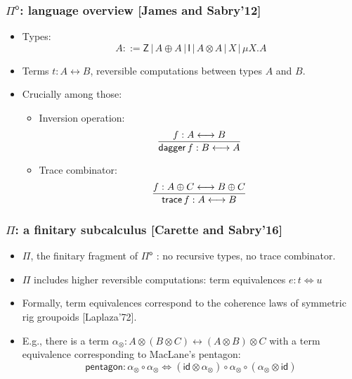 \documentclass[12pt,t]{beamer}
\newcommand{\Pio}{\ensuremath{\mathsf{\Pi}^{\mathsf{o}}}}
\newcommand{\id}{\mathsf{id}}
\newcommand{\lr}{\longleftrightarrow}
\newcommand{\trace}{\ensuremath{\mathsf{trace}}}
\newcommand{\Z}{\mathsf{Z}}
\newcommand{\I}{\mathsf{I}}
\newcommand{\LR}{\iff}
\renewcommand{\dagger}{\mathsf{dagger}}
\begin{document}
\begin{frame}

  \frametitle{\Pio: language overview [James and Sabry'12]}

  \begin{itemize}

  \item Types:
    \[
    A ::= \Z \, | \,A \oplus A \, | \,\I \,| \,A \otimes A \,| \,X \,|
    \,\mu X.A
    \]
  \item Terms $t : A \lr B$, reversible computations between types $A$
    and $B$.
  \item Crucially among those:
    \begin{itemize}          
    \item Inversion operation:
      \[
      \infer{\dagger \,f : B \lr A}{f : A \lr B}
      \]
    \item Trace combinator:
      \[
      \infer{\trace \,f: A \lr B}{f : A \oplus C \lr B \oplus C}
      \]
    \end{itemize}    
  \end{itemize}
  
\end{frame}


\begin{frame}

  \frametitle{$\Pi$: a finitary subcalculus [Carette and Sabry'16]}

  \begin{itemize}

  \item $\Pi$, the finitary fragment of $\Pio$ : no recursive types,
    no trace combinator.

  \item $\Pi$ includes higher reversible computations: term
    equivalences $e : t \LR u$
  \item Formally, term equivalences correspond to the coherence laws of
    symmetric rig groupoids [Laplaza'72].
  \item E.g., there is a term $\alpha_{\otimes} : A \otimes (B \otimes
    C) \lr (A \otimes B) \otimes C$ with a term equivalence
    corresponding to MacLane's pentagon:
    \[
    \mathsf{pentagon} : \alpha_{\otimes} \circ \alpha_{\otimes} \LR (\id \otimes
    \alpha_{\otimes}) \circ \alpha_{\otimes} \circ (\alpha_{\otimes}
    \otimes \id)
    \]
    
  \end{itemize}
  
\end{frame}
\end{document}
